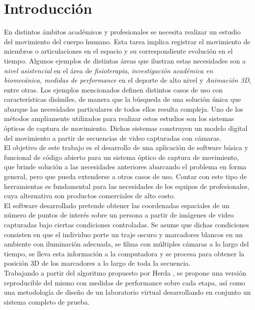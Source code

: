 \section{Introducción}
En distintos ámbitos académicos y profesionales se necesita realizar un estudio del movimiento del cuerpo humano. Esta tarea implica registrar el movimiento de miembros o articulaciones en el espacio y su correspondiente evolución en el tiempo. Algunos ejemplos de distintas áreas que ilustran estas necesidades son a \emph{nivel asistencial} en el área de \emph{fisioterapia}, \emph{investigación académica en biomecánica,} \emph{medidas de performance} en el deporte de alto nivel y \emph{Animación 3D}, entre otras. Los ejemplos mencionados definen distintos casos de uso con características disímiles, de manera que la búsqueda de una solución única que abarque las necesidades particulares de todos ellos resulta compleja.  Uno de los métodos ampliamente utilizados para realizar estos estudios son los sistemas ópticos de captura de movimiento. Dichos sistemas construyen un modelo digital del movimiento a partir de secuencias de video capturadas con cámaras.\\
\hspace*{0.5cm}El objetivo de este trabajo es el desarrollo de una aplicación de software básica y funcional de código abierto para un sistema óptico de captura de movimiento, que brinde solución a las necesidades anteriores abarcando el problema en forma general, pero que pueda extenderse a otros casos de uso. Contar con este tipo de herramientas es fundamental para las necesidades de los equipos de profesionales, cuya alternativa son productos comerciales de alto costo.\\
\hspace*{0.5cm}El software desarrollado pretende obtener las coordenadas espaciales de un número de puntos de interés sobre un persona a partir de imágenes de video capturadas bajo ciertas condiciones controladas. Se asume que dichas condiciones consisten en que el individuo porte un traje oscuro y marcadores blancos en un ambiente con iluminación adecuada, se filma con múltiples cámaras a lo largo del tiempo, se lleva esta información a la computadora y se procesa para obtener la posición 3D de los marcadores a lo largo de toda la secuencia.\\
\hspace*{0.5cm}Trabajando a partir del algoritmo propuesto por Herda \cite{herda}, se propone una versión reproducible del mismo con medidas de performance sobre cada etapa, así como una metodología de diseño de un laboratorio virtual desarrollando en conjunto  un sistema completo de prueba.

